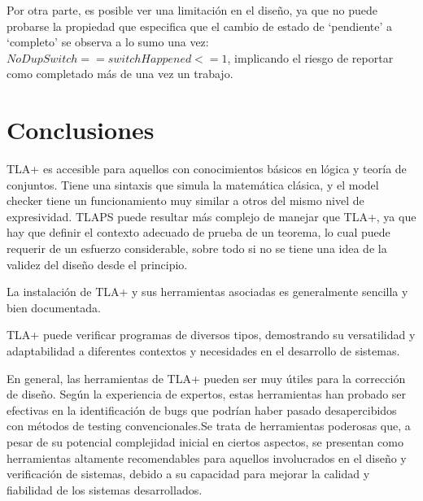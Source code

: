\documentclass[runningheads]{llncs}
\begin{document}
Por otra parte, es posible ver una limitación en el diseño, ya que no puede probarse la propiedad que especifica que el cambio de estado de ‘pendiente’ a ‘completo’ se observa a lo sumo una vez: $NoDupSwitch == switchHappened <= 1$, implicando el riesgo de reportar como completado más de una vez un trabajo.

\section{Conclusiones}

TLA+ es accesible para aquellos con conocimientos básicos en lógica y teoría de conjuntos. Tiene una sintaxis que simula la matemática clásica, y el model checker tiene un funcionamiento muy similar a otros del mismo nivel de expresividad. TLAPS puede resultar más complejo de manejar que TLA+, ya que hay que definir el contexto adecuado de prueba de un teorema, lo cual puede requerir de un esfuerzo considerable, sobre todo si no se tiene una idea de la validez del diseño desde el principio. 

La instalación de TLA+ y sus herramientas asociadas es generalmente sencilla y bien documentada.

TLA+ puede verificar programas de diversos tipos, demostrando su versatilidad y adaptabilidad a diferentes contextos y necesidades en el desarrollo de sistemas.

En general, las herramientas de TLA+ pueden ser muy útiles para la corrección de diseño. Según la experiencia de expertos, estas herramientas han probado ser efectivas en la identificación de bugs que podrían haber pasado desapercibidos con métodos de testing convencionales.Se trata de herramientas poderosas que, a pesar de su potencial complejidad inicial en ciertos aspectos, se presentan como herramientas altamente recomendables para aquellos involucrados en el diseño y verificación de sistemas, debido a su capacidad para mejorar la calidad y fiabilidad de los sistemas desarrollados.
\end{document}
